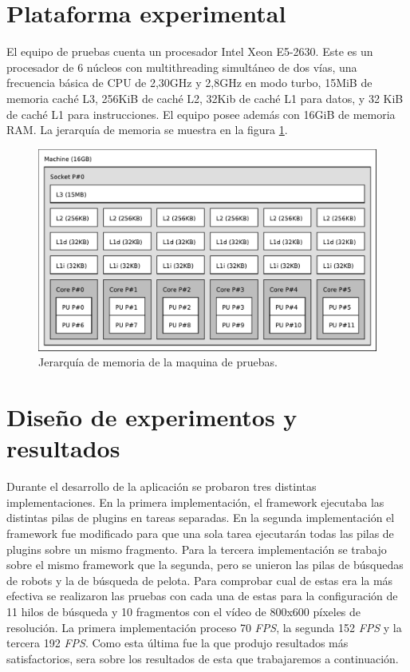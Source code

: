\section{Plataforma experimental}

\label{plataformaExperimental}

El equipo de pruebas cuenta un procesador Intel Xeon E5-2630. Este es un
procesador de 6 núcleos con multithreading simultáneo de dos vías, una
frecuencia básica de CPU de 2,30GHz y 2,8GHz en modo turbo, 15MiB de memoria
caché L3, 256KiB de caché L2, 32Kib de caché L1 para datos, y 32 KiB de caché L1
para instrucciones. El equipo posee además con 16GiB de memoria RAM. La
jerarquía de memoria se muestra en la figura \ref{topoMemoria}.

\begin{figure}[h]

	\includegraphics[width=\textwidth]{img/topo.pdf}
	\caption{Jerarquía de memoria de la maquina de pruebas.}

	\label{topoMemoria}

\end{figure}

\section{Diseño de experimentos y resultados}

\label{resultados}

Durante el desarrollo de la aplicación se probaron tres distintas
implementaciones. En la primera implementación, el framework ejecutaba las
distintas pilas de plugins en tareas separadas. En la segunda implementación el
framework fue modificado para que una sola tarea ejecutarán todas las pilas de
plugins sobre un mismo fragmento. Para la tercera implementación se trabajo
sobre el mismo framework que la segunda, pero se unieron las pilas de búsquedas
de robots y la de búsqueda de pelota. Para comprobar cual de estas era la más
efectiva se realizaron las pruebas con cada una de estas para la configuración
de 11 hilos de búsqueda y 10 fragmentos con el vídeo de 800x600 píxeles de
resolución. La primera implementación proceso 70 \emph{FPS}, la segunda 152
\emph{FPS} y la tercera 192 \emph{FPS}. Como esta última fue la que produjo
resultados más satisfactorios, sera sobre los resultados de esta que
trabajaremos a continuación.

